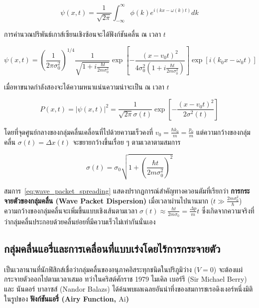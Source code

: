 \begin{equation}
\psi(x, t) = \frac{1}{\sqrt{2\pi}} \int_{-\infty}^\infty \phi(k) e^{i(k x - \omega(k) t)} dk
\end{equation}

การคำนวณปริพันธ์เกาส์เซียนเชิงซ้อนจะได้ฟังก์ชันคลื่น ณ เวลา $t$

\begin{equation}
\psi(x, t) = \left( \frac{1}{2\pi \sigma_0^2} \right)^{1/4} \frac{1}{\sqrt{1 + i\frac{\hbar t}{2m\sigma_0^2}}} \exp\left[ -\frac{(x - v_0 t)^2}{4\sigma_0^2\left( 1 + i\frac{\hbar t}{2m\sigma_0^2} \right)} \right] \exp\left[ i(k_0 x - \omega_0 t) \right]
\label{eq:wave_packet_time_evolved}
\end{equation}

เมื่อหาขนาดกำลังสองจะได้ความหนาแน่นความน่าจะเป็น ณ เวลา $t$

\begin{equation}
P(x, t) = |\psi(x, t)|^2 = \frac{1}{\sqrt{2\pi}\sigma(t)} \exp\left[ -\frac{(x - v_0 t)^2}{2\sigma^2(t)} \right]
\label{eq:gaussian_probability_density_t}
\end{equation}

โดยที่จุดศูนย์กลางของกลุ่มคลื่นเคลื่อนที่ไปด้วยความเร็วคงที่ $v_0 = \frac{\hbar k_0}{m} = \frac{p_0}{m}$ แต่ความกว้างของกลุ่มคลื่น $\sigma(t) = \Delta x(t)$ จะขยายกว้างขึ้นเรื่อย ๆ ตามเวลาตามสมการ

\begin{equation}
\sigma(t) = \sigma_0 \sqrt{1 + \left( \frac{\hbar t}{2 m \sigma_0^2} \right)^2}
\label{eq:wave_packet_spreading}
\end{equation}

สมการ~\eqref{eq:wave_packet_spreading} แสดงปรากฏการณ์สำคัญทางควอนตัมที่เรียกว่า \textbf{การกระจายตัวของกลุ่มคลื่น (Wave Packet Dispersion)} เมื่อเวลาผ่านไปนานมาก ($t \gg \frac{2m\sigma_0^2}{\hbar}$) ความกว้างของกลุ่มคลื่นจะเพิ่มขึ้นแบบเชิงเส้นตามเวลา $\sigma(t) \approx \frac{\hbar t}{2m\sigma_0} = \frac{\Delta p}{m} t$ ซึ่งเกิดจากความจริงที่ว่ากลุ่มคลื่นประกอบด้วยคลื่นย่อยที่มีความเร็วไม่เท่ากันนั่นเอง

\subsection{กลุ่มคลื่นแอรี่และการเคลื่อนที่แบบเร่งโดยไร้การกระจายตัว}

เป็นเวลานานที่นักฟิสิกส์เชื่อว่ากลุ่มคลื่นของอนุภาคอิสระทุกชนิดในปริภูมิว่าง ($V = 0$) จะต้องแผ่กระจายตัวออกไปตามเวลาเสมอ ทว่าในคริสต์ศักราช 1979 ไมเคิล เบอร์รี (Sir Michael Berry) และ นันดอร์ บาลาซส์ (Nandor Balazs) ได้ค้นพบผลเฉลยอันน่าทึ่งของสมการชเรอดิงเงอร์หนึ่งมิติในรูปของ \textbf{ฟังก์ชันแอรี่ (Airy Function, $\text{Ai}$)}

